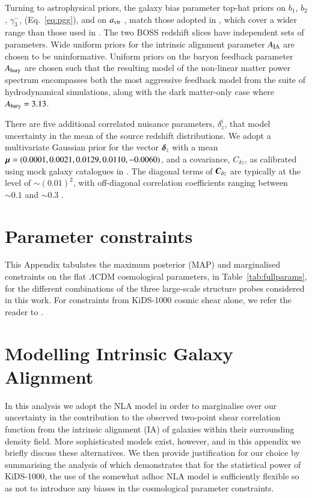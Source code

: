 \begin{appendix}
Turning to astrophysical priors, the galaxy bias parameter top-hat priors on $b_1$, $b_2$,  $\gamma_3^-$, (Eq.~\ref{eq:pgg}), and on $a_{\rm vir}$ \citep[see the `fingers of god' model in equations 6 to 9 of][]{joachimi/etal:inprep},
match those adopted in \citet{troester/etal:2020}, which cover a wider range than those used in \citet{sanchez/etal:2017}.  
The two BOSS redshift slices have independent sets of parameters.   
Wide uniform priors for the intrinsic alignment parameter $A_{\rm IA}$ are chosen to be uninformative.    
Uniform priors on the baryon feedback parameter $A_{\rm bary}$ are chosen such that the resulting \citet{mead/etal:2016} model of the non-linear matter power spectrum encompasses both the most aggressive feedback model from the \citet{vandaalen/etal:2011} suite of hydrodynamical simulations, along with the dark matter-only case where $A_{\rm bary}=3.13$.

There are five additional correlated nuisance parameters, $\delta^i_z$, that model uncertainty in the mean of the source redshift distributions.  We adopt a multivariate Gaussian prior for the vector $\mbox{\boldmath $\delta$}_z$ with a mean $\mbox{\boldmath $\mu$} = (0.0001,0.0021,0.0129,0.0110,-0.0060)$, and a covariance, $C_{\delta z}$, as calibrated using mock galaxy catalogues in \citet{wright/etal:2020}.   
The diagonal terms of $\mbox{\boldmath $C$}_{\delta z}$ are typically at the level of $\sim\!(0.01)^2$, with off-diagonal correlation coefficients ranging between $\sim\! 0.1$ and $\sim\! 0.3$ \citep[see section 3 and figure 2 of][for details]{hildebrandt/etal:inprep}.


\section{Parameter constraints}
\label{app:parameter-constraints}
This Appendix tabulates the maximum posterior (MAP) and marginalised constraints on the flat $\Lambda$CDM cosmological parameters, in Table~\ref{tab:fullparams}, for the different combinations of the three large-scale structure probes considered in this work.   For constraints from KiDS-1000 cosmic shear alone, we refer the reader to \citet{asgari/etal:inprep}.


\section{Modelling Intrinsic Galaxy Alignment}
\label{app:IAmodel}
In this analysis we adopt the \citet{bridle/king:2007} NLA model in order to marginalise over our uncertainty in the contribution to the observed two-point shear correlation function from the intrinsic alignment (IA) of galaxies within their surrounding density field.   More sophisticated models exist, however, and in this appendix we briefly discuss these alternatives.   We then provide justification for our choice by summarising the analysis of \citet{fortuna/etal:2020} which demonstrates that for the statistical power of KiDS-1000, the use of the somewhat adhoc NLA model is sufficiently flexible so as not to introduce any biases in the cosmological parameter constraints.


\end{appendix}
